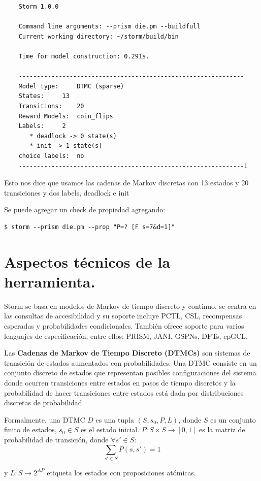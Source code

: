 \documentclass[11pt]{article}
\begin{document}
\begin{verbatim}
	Storm 1.0.0

	Command line arguments: --prism die.pm --buildfull
	Current working directory: ~/storm/build/bin
	
	Time for model construction: 0.291s.
	
	--------------------------------------------------------------
	Model type: 	DTMC (sparse)
	States: 	13
	Transitions: 	20
	Reward Models:  coin_flips
	Labels: 	2
	   * deadlock -> 0 state(s)
	   * init -> 1 state(s)
	choice labels: 	no
	--------------------------------------------------------------i
\end{verbatim}

Esto nos dice que usamos las cadenas de Markov discretas con 13 estados y 20 transiciones y dos labels, deadlock e init

Se puede agregar un check de propiedad agregando:

\begin{verbatim}
$ storm --prism die.pm --prop "P=? [F s=7&d=1]"
\end{verbatim}


\section{Aspectos t\'ecnicos de la herramienta.}

Storm se basa en modelos de Markov de tiempo discreto y continuo, se centra en las consultas de accesibilidad y su soporte incluye PCTL, CSL, recompensas esperadas y probabilidades condicionales. Tambi\'en ofrece soporte para varios lenguajes de especificaci\'on, entre ellos: PRISM, JANI, GSPNs, DFTs, cpGCL.

Las \textbf{Cadenas de Markov de Tiempo Discreto (DTMCs)} son sistemas de transici\'on de estados aumentados con probabilidades. Una DTMC consiste en un conjunto discreto de estados que representan posibles configuraciones del sistema donde ocurren transiciones entre estados en pasos de tiempo discretos y la probabilidad de hacer transiciones entre estados est\'a dada por distribuciones discretas de probabilidad.
 
Formalmente, una DTMC $D$ es una tupla $(S, s_0, P, L)$, donde $S$ es un conjunto finito de estados, $s_0 \in S$ es el estado inicial. $P: S \times S \rightarrow [0,1]$ es la matriz de probabilidad de transici\'on, donde $\forall  s' \in S$:
\[
\sum_{s' \in S} P(s,s') = 1
\]

y $L: S \rightarrow 2^{AP}$ etiqueta los estados con proposiciones at\'omicas.
\end{document}
